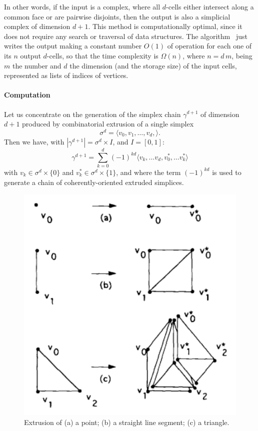 \documentclass[11pt,oneside]{article}	%
\begin{document}
In other words, if the input is a complex, where all $d$-cells either intersect along a common face or are pairwise disjoints, then the output is also a simplicial complex of dimension $d+1$. This method is computationally optimal, since it does not require any search or traversal of data structures. The algorithm~\cite{DBLP:journals/cad/FerruciP91} just writes the output making a constant number $O(1)$ of operation for each one of its $n$ output $d$-cells, so that the time complexity is $\Omega(n)$, where $n = d\,m$, being $m$ the number and $d$ the dimension (and the storage size) of the input cells, represented as lists of indices of vertices.

\paragraph{Computation}

Let us concentrate on the generation of the simplex chain $\gamma^{d+1}$ of dimension $d+1$ produced by combinatorial extrusion of a single simplex 
\[
\sigma^d = \langle v_0, v_1, \ldots, v_d,   \rangle .
\]
Then we have, with $|\gamma^{d+1}| = \sigma^d \times I$, and $I=[0,1]$:
\[
\gamma^{d+1} = \sum_{k=0}^{d} (-1)^{kd} \langle v_k, \ldots v_d, v^*_0, \ldots  v^*_k \rangle 
\]
with $v_k\in \sigma^d \times \{0\}$ and  $v^*_k\in \sigma^d \times \{1\}$, and where the term $(-1)^{kd}$ is used to generate a chain of coherently-oriented extruded simplices.

\begin{figure}[htbp] %
   \centering
   \begin{minipage}[c]{0.49\linewidth}
		\caption{Extrusion of (a) a point; (b) a straight line segment; (c) a triangle.}
	\end{minipage} 
   \begin{minipage}[c]{0.49\linewidth}
		\includegraphics[width=0.8\linewidth]{images/extrusion}
	\end{minipage} 
   \label{fig:extrusion}
\end{figure}
\end{document}
